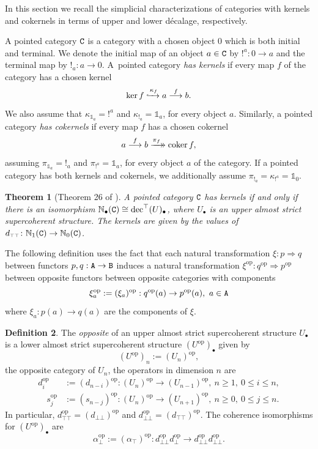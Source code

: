 \documentclass[12pt,leqno]{amsart}
\newtheorem{theorem}{Theorem}%
\theoremstyle{definition}
\newtheorem{definition}[theorem]{Definition}
\def\udec{{\rm dec}^{\top}}
\def\ttN{{\mathbb N}}
\def\id{{\mathbb 1}}
\def\atop{\alpha_{\scriptscriptstyle\top}}
\def\abot{\alpha_{\scriptscriptstyle\bot}}
\def\dttop{d_{\scriptscriptstyle{\top\top}}}
\def\dttop{d_{\scriptscriptstyle{\top\top}}}
\def\dbot{d_{\scriptscriptstyle\bot}}
\def\dbbot{d_{\scriptscriptstyle\bot\bot}}
\newcommand{\xrightarrowdbl}[2][]{%
  \xrightarrow[#1]{#2}\mathrel{\mkern-14mu}\rightarrow
}
\newcommand{\C}{{\tt C}}
\newcommand{\NN}{\mathbb{N}}
\newcommand{\4}{\texttt{4}}
\DeclareMathOperator{\op}{op}
\DeclareMathOperator{\coker}{coker}
\begin{document}
In this section we 
recall the simplicial characterizations of categories 
with kernels and cokernels in terms of upper and lower d\'ecalage, respectively.


A pointed category $\C$ is a category with a chosen object 0 which is both initial and terminal. We denote the initial map of an object $a\in \C$ by $!^a\colon 0\to a$ and the terminal map by $!_a\colon a \to 0$. A~pointed category \textit{has kernels} if every map $f$ of the category has a chosen kernel
$$\ker f \xhookrightarrow{\kappa_f} a\stackrel{f}\longrightarrow b.$$
 We also assume that $\kappa_{\id_a}=!^a$ and $\kappa_{!_a}=\id_a$, for every object $a$. Similarly, a pointed category \textit{has cokernels} if every map $f$ has a chosen cokernel 
$$a\stackrel{f}\longrightarrow b\xrightarrowdbl{\pi_f} \coker f,$$
 assuming $\pi_{\id_a}=!_a$ and $\pi_{!^a}=\id_a$, for every object $a$ of the category.
 If a pointed category has both kernels and cokernels, we additionally assume $\pi_{!_a}=\kappa_{!^a}=\id_{0}$.



\begin{theorem}[Theorem 26 of \cite{pasticio}]
\label{Jen aby si stihla vyridit pas.}
A pointed category $\C$ has kernels if and only
if there is an isomorphism $\ttN_\bullet(\C) \cong\udec(U)_\bullet$,
where $U_\bullet$ is an upper almost strict supercoherent structure. 
The kernels are given by the values of $\dttop\colon \NN_{1}(\C)\to \NN_0(\C)$.
\end{theorem}

The following definition
uses the fact that each natural transformation  $\xi : p
\Rightarrow q$ between  
functors $p,q : {\tt A} \to {\tt B}$ induces a natural 
transformation $\xi^{\op} : q^{\op}
\Rightarrow p^{\op}$ between opposite functors between opposite
categories   
with components 
\[
\xi^{\op} _a : = (\xi_a)^{\op} :
q^{\op}(a) 
\to p^{\op}(a), \ a \in {\tt A}
\]
where $\xi_a : p(a) \to
q(a)$ are the components of $\xi$. 

\begin{definition}
The \textit{opposite} of an upper almost strict supercoherent
structure $U_\bullet$ is a lower almost strict supercoherent
structure $(U^{\op})_\bullet$ given by
\[
(U^{\op})_n:= (U_n)^{\op},
\] 
the opposite category of $U_n$, the
operators in dimension $n$ are
\begin{align*}
d_i^{\op}&:= (d_{n-i})^{\op}\colon (U_n)^{\op}\longrightarrow (U_{n-1})^{\op},
\ n \geq 1, \ 0 \leq i \leq n,
\\
\quad s_j^{\op}&:= (s_{n-j})^{\op}\colon (U_n)^{\op}\longrightarrow
                 (U_{n+1})^{\op}, \ n \geq 0, \ 0 \leq j \leq n.
\end{align*}
In particular, $\dttop^{\op}=(\dbbot)^{\op}$ and
$\dbbot^{\op}=(\dttop)^{\op}$. The coherence isomorphisms for
$(U^{\op})_\bullet$ are
\[\abot^{\op}:=(\atop)^{\op}\colon
  \dbbot^{\op}\dbot^{\op}\longrightarrow \dbbot^{\op}\dbbot^{\op}.
\]
\end{definition}
\end{document}
